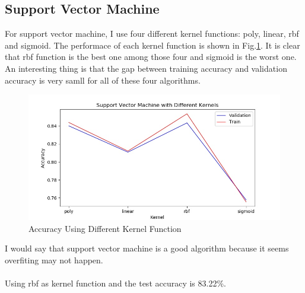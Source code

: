 \documentclass[11pt]{article}
\begin{document}
\subsection{Support Vector Machine}
For support vector machine, I use four different kernel functions: poly, linear, rbf and sigmoid. The performace of each kernel function is shown in Fig.\ref{fig:adult_svm}. It is clear that rbf function is the best one among those four and sigmoid is the worst one. An interesting thing is that the gap between training accuracy and validation accuracy is very samll for all of these four algorithms.
\begin{figure}[h!]
  \includegraphics[width=\linewidth]{./adult/svm_kernel.jpg}
  \caption{Accuracy Using Different Kernel Function}
  \label{fig:adult_svm}
\end{figure}
I would say that support vector machine is a good algorithm because it seems overfiting may not happen.\\
\\
Using rbf as kernel function and the test accuracy is 83.22\%.
\end{document}
